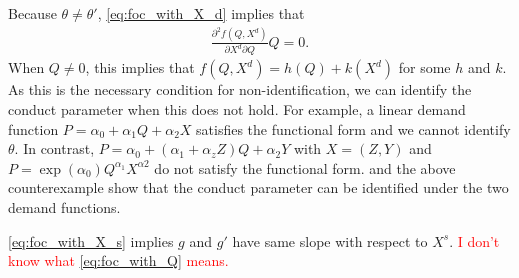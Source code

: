\documentclass[11pt, a4paper]{article}
\theoremstyle{remark}
\begin{document}
Because $\theta \ne \theta'$, \eqref{eq:foc_with_X_d} implies that 
\begin{align}
    \frac{\partial^2 f(Q,X^{d})}{\partial X^{d}\partial Q}Q = 0.
\end{align}
When $Q\ne 0$, this implies that $f(Q, X^{d}) = h(Q) + k(X^{d})$ for some $h$ and $k$. 
As this is the necessary condition for non-identification, we can identify the conduct parameter when this does not hold.
For example, a linear demand function $P = \alpha_0 + \alpha_1 Q + \alpha_2 X$ satisfies the functional form and we cannot identify $\theta$.
In contrast, $P = \alpha_0 + (\alpha_1 +\alpha_z Z) Q + \alpha_2 Y$ with $X = (Z,Y)$ and $P = \exp(\alpha_0)Q^{\alpha_1}X^{\alpha2}$ do not satisfy the functional form.
\citet{bresnahan1982oligopoly} and the above counterexample show that the conduct parameter can be identified under the two demand functions.

\eqref{eq:foc_with_X_s} implies $g$ and $g'$ have same slope with respect to $X^{s}$.
\textcolor{red}{I don't know what \eqref{eq:foc_with_Q} means.}

\newpage


\end{document}
